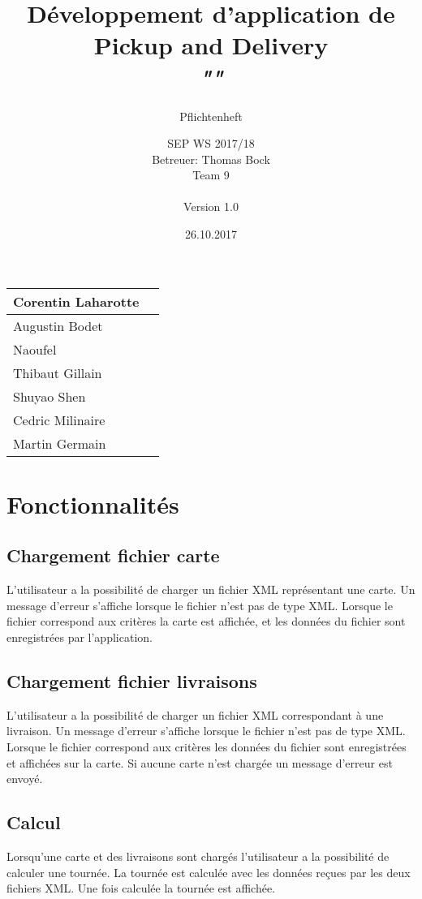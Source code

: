 \documentclass{scrartcl}
\title{Développement d'application de Pickup and Delivery\\
\textit{"\name"}}
\subtitle{Pflichtenheft}
\author{SEP WS 2017/18\\
Betreuer: Thomas Bock\\
Team 9\\ \\
Version 1.0}
\date{26.10.2017}
\begin{document}
\maketitle

\iffalse
\begin{figure}[h]
	\centering
  \texttt{[image: ../img/insta\_logo]}
	\label{fig:logo}
\end{figure}
\fi
\vfill

\begin{center}
  \begin{tabular}{ | l | r | }
    \hline
    Corentin Laharotte \\ \hline
    Augustin Bodet  \\ \hline
    Naoufel \\ \hline
    Thibaut Gillain \\ \hline
    Shuyao Shen \\ \hline
    Cedric Milinaire\\ \hline
    Martin Germain \\ \hline
  \end{tabular}
\end{center}

\thispagestyle{empty}
\pagebreak
\renewcommand{\contentsname}{Table des matières}
\tableofcontents
\newpage

\section{Fonctionnalités}
\subsection{Chargement fichier carte}
L'utilisateur a la possibilité de charger un fichier XML représentant une carte. Un message d'erreur s'affiche lorsque le fichier n'est pas de type XML. Lorsque le fichier correspond aux critères la carte est affichée, et les données du fichier sont enregistrées par l'application. 
\subsection{Chargement fichier livraisons}
L'utilisateur a la possibilité de charger un fichier XML correspondant à une livraison. Un message d'erreur s'affiche lorsque le fichier n'est pas de type XML. Lorsque le fichier correspond aux critères les données du fichier sont enregistrées et affichées sur la carte. Si aucune carte n'est chargée un message d'erreur est envoyé. 
\subsection{Calcul}
Lorsqu'une carte et des livraisons sont chargés l'utilisateur a la possibilité de calculer une tournée. La tournée est calculée avec les données reçues par les deux fichiers XML. Une fois calculée la tournée est affichée. 
\end{document}
